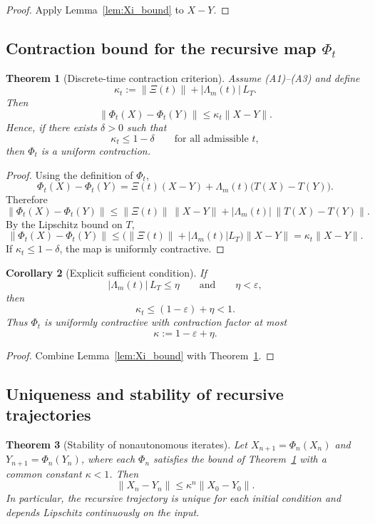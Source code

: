 \documentclass[11pt,a4paper]{article}
\theoremstyle{plain}
\newtheorem{theorem}{Theorem}[section]
\newtheorem{corollary}[theorem]{Corollary}
\theoremstyle{definition}
\theoremstyle{remark}
\begin{document}
\begin{proof}
Apply Lemma~\ref{lem:Xi_bound} to \(X-Y\).
\end{proof}

\subsection{Contraction bound for the recursive map \(\Phi_t\)}

\begin{theorem}[Discrete-time contraction criterion]
\label{thm:Phi_contraction}
Assume \textup{(A1)}--\textup{(A3)} and define
\[
\kappa_t := \|\Xi(t)\| + |\Lambda_m(t)|\,L_T.
\]
Then
\[
\|\Phi_t(X)-\Phi_t(Y)\|
\le
\kappa_t \|X-Y\|.
\]
Hence, if there exists \(\delta>0\) such that
\[
\kappa_t \le 1-\delta
\qquad
\text{for all admissible } t,
\]
then \(\Phi_t\) is a uniform contraction.
\end{theorem}

\begin{proof}
Using the definition of \(\Phi_t\),
\[
\Phi_t(X)-\Phi_t(Y)
=
\Xi(t)(X-Y)+\Lambda_m(t)\bigl(T(X)-T(Y)\bigr).
\]
Therefore
\[
\|\Phi_t(X)-\Phi_t(Y)\|
\le
\|\Xi(t)\|\,\|X-Y\|
+
|\Lambda_m(t)|\,\|T(X)-T(Y)\|.
\]
By the Lipschitz bound on \(T\),
\[
\|\Phi_t(X)-\Phi_t(Y)\|
\le
\bigl(\|\Xi(t)\|+|\Lambda_m(t)|L_T\bigr)\|X-Y\|
=
\kappa_t \|X-Y\|.
\]
If \(\kappa_t\le 1-\delta\), the map is uniformly contractive.
\end{proof}

\begin{corollary}[Explicit sufficient condition]
\label{cor:explicit_condition}
If
\[
|\Lambda_m(t)|\,L_T \le \eta
\qquad\text{and}\qquad
\eta<\varepsilon,
\]
then
\[
\kappa_t \le (1-\varepsilon)+\eta < 1.
\]
Thus \(\Phi_t\) is uniformly contractive with contraction factor at most
\[
\kappa := 1-\varepsilon+\eta.
\]
\end{corollary}

\begin{proof}
Combine Lemma~\ref{lem:Xi_bound} with Theorem~\ref{thm:Phi_contraction}.
\end{proof}

\subsection{Uniqueness and stability of recursive trajectories}

\begin{theorem}[Stability of nonautonomous iterates]
\label{thm:trajectory_stability}
Let \(X_{n+1}=\Phi_n(X_n)\) and \(Y_{n+1}=\Phi_n(Y_n)\), where each \(\Phi_n\) satisfies the bound of Theorem~\ref{thm:Phi_contraction} with a common constant \(\kappa<1\). Then
\[
\|X_n-Y_n\| \le \kappa^n \|X_0-Y_0\|.
\]
In particular, the recursive trajectory is unique for each initial condition and depends Lipschitz continuously on the input.
\end{theorem}
\end{document}

